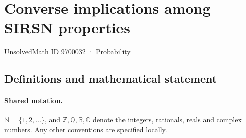 \documentclass[11pt]{article}
\begin{document}
\setcounter{section}{9700031}
\section{Converse implications among SIRSN properties}\label{9700032}
{\small\sffamily UnsolvedMath ID 9700032 · Probability}
\subsection{Definitions and mathematical statement}

\paragraph{Shared notation.}$\mathbb N=\{1,2,\ldots\}$, and $\mathbb Z,\mathbb Q,\mathbb R,\mathbb C$ denote the integers, rationals, reals and complex numbers. Any other conventions are specified locally.
\end{document}
